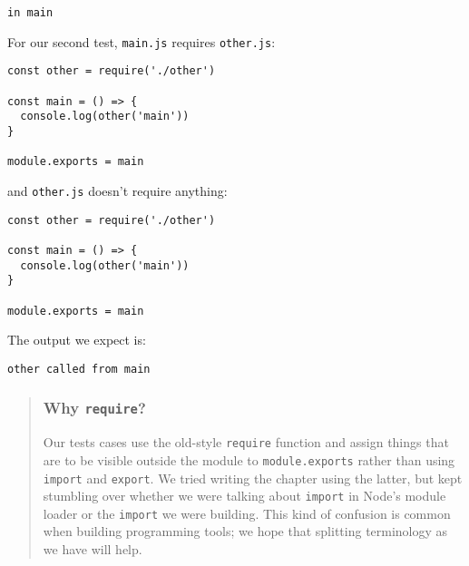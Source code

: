 \documentclass[krantzl]{krantz}
\newenvironment{callout}{\savenotes\begin{tBox}\begin{quotation}\toggletrue{inbox}\renewcommand{\thempfootnote}{\arabic{footnote}}}{\end{quotation}\vspace{\baselineskip}\end{tBox}\togglefalse{inbox}\spewnotes}
\begin{document}
\begin{lstlisting}[frame=tblr,backgroundcolor=\color{black!5}]
in main
\end{lstlisting}



\noindent For our second test,
\texttt{main.js} requires \texttt{other.js}:


\begin{lstlisting}[frame=tblr]
const other = require('./other')

const main = () => {
  console.log(other('main'))
}

module.exports = main
\end{lstlisting}



\noindent and \texttt{other.js} doesn’t require anything:


\begin{lstlisting}[frame=tblr]
const other = require('./other')

const main = () => {
  console.log(other('main'))
}

module.exports = main
\end{lstlisting}



\noindent The output we expect is:


\begin{lstlisting}[frame=tblr,backgroundcolor=\color{black!5}]
other called from main
\end{lstlisting}


\begin{callout}


\subsubsection*{Why \texttt{require}?}


Our tests cases use the old-style \texttt{require} function
and assign things that are to be visible outside the module to \texttt{module.exports}
rather than using \texttt{import} and \texttt{export}.
We tried writing the chapter using the latter,
but kept stumbling over whether we were talking about \texttt{import} in Node’s module loader
or the \texttt{import} we were building.
This kind of confusion is common when building programming tools;
we hope that splitting terminology as we have will help.

\end{callout}
\end{document}
